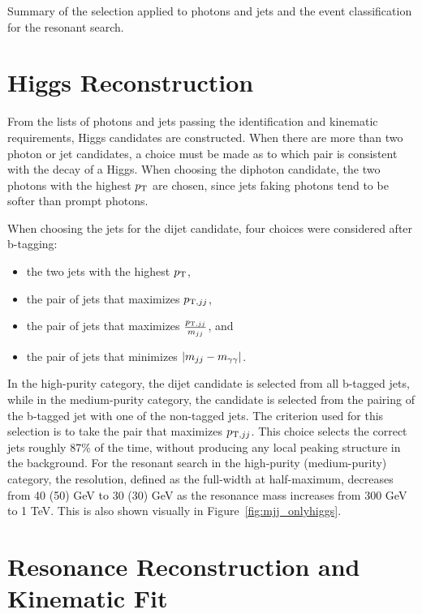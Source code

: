 \begin{table}[htbp!]
  \centering
  \renewcommand{\arraystretch}{1.4}
  \caption{Summary of the selection applied to photons and jets and the event classification
for the resonant search.}
  
  \label{table:gencut}
\end{table}

\section{Higgs Reconstruction\label{sec:higgsreconstruction}}

From the lists of photons and jets passing the identification and kinematic requirements, Higgs
candidates are constructed. When there are more than two photon or jet candidates, a choice
must be made as to which pair is consistent with the decay of a Higgs. When
choosing the diphoton candidate, the two photons with the highest $p_{\rm T}$ are chosen, since
jets faking photons tend to be softer than prompt photons.

When choosing the jets for the dijet candidate, four choices were considered after b-tagging:
\begin{itemize}
\item the two jets with the highest $p_{\rm T}$,
\item the pair of jets that maximizes $p_{{\rm T},jj}$,
\item the pair of jets that maximizes $\frac{p_{{\rm T},jj}}{m_{jj}}$, and
\item the pair of jets that minimizes $|m_{jj}-m_{\gamma\gamma}|$.
\end{itemize}
In the high-purity category, the dijet candidate is selected from all b-tagged jets,
while in the medium-purity category, the candidate is selected from the pairing of the b-tagged jet
with one of the non-tagged jets.
The criterion used for this selection is to take the pair that maximizes $p_{{\rm T},jj}$. 
This choice selects the correct jets roughly 87\% of the time, without producing any local peaking
structure in the background. For the resonant search
in the high-purity (medium-purity) category, the resolution, defined as the full-width at half-maximum,
decreases from 40 (50) GeV to 30 (30) GeV as the resonance mass increases from 300 GeV to 1 TeV.
This is also shown visually in Figure~\ref{fig:mjj_onlyhiggs}.

\section{Resonance Reconstruction and Kinematic Fit\label{sec:Xreconstruction}}

